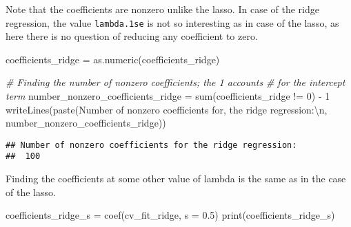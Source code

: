 \documentclass[
]{book}
\newenvironment{Shaded}{\begin{snugshade}}{\end{snugshade}}
\newcommand{\AttributeTok}[1]{\textcolor[rgb]{0.77,0.63,0.00}{#1}}
\newcommand{\CommentTok}[1]{\textcolor[rgb]{0.56,0.35,0.01}{\textit{#1}}}
\newcommand{\DecValTok}[1]{\textcolor[rgb]{0.00,0.00,0.81}{#1}}
\newcommand{\FloatTok}[1]{\textcolor[rgb]{0.00,0.00,0.81}{#1}}
\newcommand{\FunctionTok}[1]{\textcolor[rgb]{0.00,0.00,0.00}{#1}}
\newcommand{\NormalTok}[1]{#1}
\newcommand{\OtherTok}[1]{\textcolor[rgb]{0.56,0.35,0.01}{#1}}
\newcommand{\SpecialCharTok}[1]{\textcolor[rgb]{0.00,0.00,0.00}{#1}}
\newcommand{\StringTok}[1]{\textcolor[rgb]{0.31,0.60,0.02}{#1}}
\begin{document}
Note that the coefficients are nonzero unlike the lasso. In case of the ridge regression, the value \texttt{lambda.1se} is not so interesting as in case of the lasso, as here there is no question of reducing any coefficient to zero.

\begin{Shaded}
\begin{Highlighting}[]
\NormalTok{coefficients\_ridge }\OtherTok{=} \FunctionTok{as.numeric}\NormalTok{(coefficients\_ridge)}

\CommentTok{\# Finding the number of nonzero coefficients; the \textquotesingle{}{-}1\textquotesingle{} accounts}
\CommentTok{\# for the intercept term}
\NormalTok{number\_nonzero\_coefficients\_ridge }\OtherTok{=}
  \FunctionTok{sum}\NormalTok{(coefficients\_ridge }\SpecialCharTok{!=} \DecValTok{0}\NormalTok{) }\SpecialCharTok{{-}} \DecValTok{1}
\FunctionTok{writeLines}\NormalTok{(}\FunctionTok{paste}\NormalTok{(}\StringTok{\textquotesingle{}Number of nonzero coefficients for\textquotesingle{}}\NormalTok{,}
                 \StringTok{\textquotesingle{}the ridge regression:}\SpecialCharTok{\textbackslash{}n}\StringTok{\textquotesingle{}}\NormalTok{,}
\NormalTok{                 number\_nonzero\_coefficients\_ridge))}
\end{Highlighting}
\end{Shaded}

\begin{verbatim}
## Number of nonzero coefficients for the ridge regression:
##  100
\end{verbatim}

Finding the coefficients at some other value of lambda is the same as in the case of the lasso.

\begin{Shaded}
\begin{Highlighting}[]
\NormalTok{coefficients\_ridge\_s }\OtherTok{=} \FunctionTok{coef}\NormalTok{(cv\_fit\_ridge, }\AttributeTok{s =} \FloatTok{0.5}\NormalTok{)}
\FunctionTok{print}\NormalTok{(coefficients\_ridge\_s)}
\end{Highlighting}
\end{Shaded}
\end{document}
